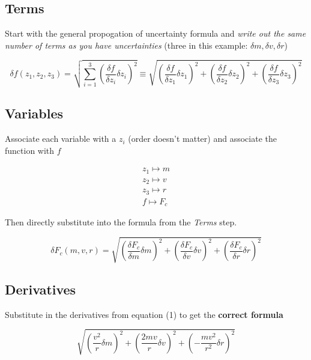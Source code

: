 \documentclass[12pt,letterpaper]{article}
\begin{document}
\subsection*{Terms}
Start with the general propogation of uncertainty formula and \textit{write out the same number of terms as you have uncertainties} (three in this example: $\delta m, \delta v, \delta r$)
\begin{center}
\begin{equation}
\delta f(z_1, z_2, z_3) = \sqrt{\sum_{i=1}^{3}(\frac{\delta f}{\delta z_i} \delta z_i)^2} \equiv \sqrt{(\frac{\delta f}{\delta z_1} \delta z_1)^2 + (\frac{\delta f}{\delta z_2} \delta z_2)^2 + (\frac{\delta f}{\delta z_3} \delta z_3)^2}
\end{equation}
\end{center}
\subsection*{Variables}
Associate each variable with a $z_i$ (order doesn't matter) and associate the function with $f$
\begin{center}
\begin{align*}
z_1 \mapsto m \\
z_2 \mapsto v \\
z_3 \mapsto r \\
f \mapsto F_c
\end{align*}
\end{center}
Then directly substitute into the formula from the \textit{Terms} step.
\begin{center}
\begin{equation}
\delta F_c (m, v, r) = \sqrt{(\frac{\delta F_c}{\delta m} \delta m)^2 + (\frac{\delta F_c}{\delta v} \delta v)^2 + (\frac{\delta F_c}{\delta r} \delta r)^2}
\end{equation}
\end{center}
\subsection*{Derivatives}
Substitute in the derivatives from equation (1) to get the \textbf{correct formula}
\begin{center}
 \[
 \boxed{\sqrt{(\frac{v^2}{r} \delta m)^2 + (\frac{2 mv}{r} \delta v)^2 + (-\frac{m v^2}{r^2} \delta r)^2}}
 \]
\end{center}
\end{document}
